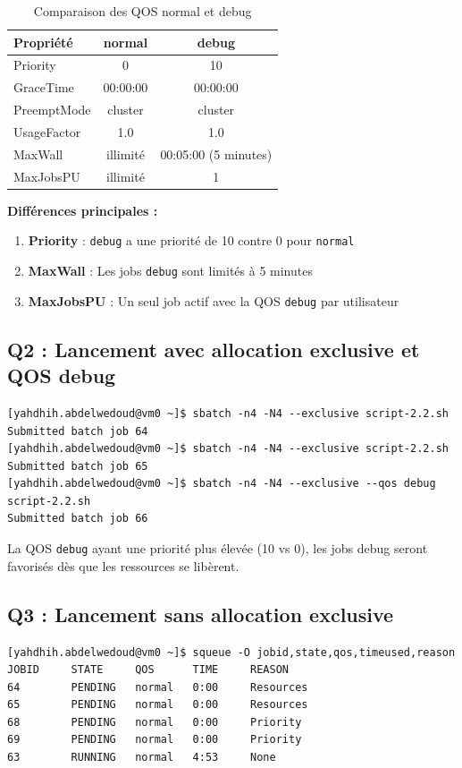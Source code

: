 \documentclass[12pt,a4paper]{article}
\newcommand{\code}[1]{\texttt{#1}}
\begin{document}
\begin{table}[h]
\centering
\begin{tabular}{|l|c|c|}
\hline
\textbf{Propriété} & \textbf{normal} & \textbf{debug} \\
\hline
Priority & 0 & 10 \\
GraceTime & 00:00:00 & 00:00:00 \\
PreemptMode & cluster & cluster \\
UsageFactor & 1.0 & 1.0 \\
MaxWall & illimité & 00:05:00 (5 minutes) \\
MaxJobsPU & illimité & 1 \\
\hline
\end{tabular}
\caption{Comparaison des QOS normal et debug}
\end{table}

\textbf{Différences principales :}
\begin{enumerate}
    \item \textbf{Priority} : \code{debug} a une priorité de 10 contre 0 pour \code{normal}
    \item \textbf{MaxWall} : Les jobs \code{debug} sont limités à 5 minutes
    \item \textbf{MaxJobsPU} : Un seul job actif avec la QOS \code{debug} par utilisateur
\end{enumerate}

\subsection{Q2 : Lancement avec allocation exclusive et QOS debug}

\begin{lstlisting}
[yahdhih.abdelwedoud@vm0 ~]$ sbatch -n4 -N4 --exclusive script-2.2.sh
Submitted batch job 64
[yahdhih.abdelwedoud@vm0 ~]$ sbatch -n4 -N4 --exclusive script-2.2.sh
Submitted batch job 65
[yahdhih.abdelwedoud@vm0 ~]$ sbatch -n4 -N4 --exclusive --qos debug script-2.2.sh
Submitted batch job 66
\end{lstlisting}

La QOS \code{debug} ayant une priorité plus élevée (10 vs 0), les jobs debug seront favorisés dès que les ressources se libèrent.

\subsection{Q3 : Lancement sans allocation exclusive}

\begin{lstlisting}
[yahdhih.abdelwedoud@vm0 ~]$ squeue -O jobid,state,qos,timeused,reason
JOBID     STATE     QOS      TIME     REASON              
64        PENDING   normal   0:00     Resources           
65        PENDING   normal   0:00     Resources           
68        PENDING   normal   0:00     Priority            
69        PENDING   normal   0:00     Priority            
63        RUNNING   normal   4:53     None                
\end{lstlisting}
\end{document}
